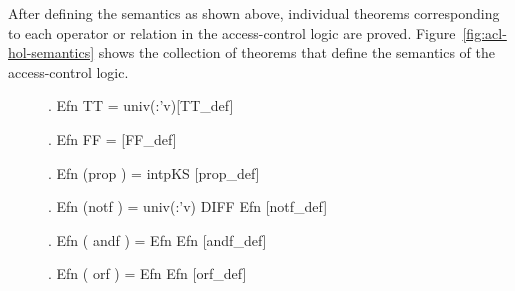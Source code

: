 After defining the semantics as shown above, individual theorems corresponding to each operator or relation in the access-control logic are proved. Figure~\ref{fig:acl-hol-semantics} shows the collection of theorems that define the semantics of the access-control logic.
\begin{figure}[t]
  \centering
\begin{minipage}{1.0\linewidth}
\begin{small}
\HOLTokenTurnstile{} \HOLTokenForall{}  . Efn    TT = univ(:'v)\hfill{[TT\_def]}

\HOLTokenTurnstile{} \HOLTokenForall{}  . Efn    FF = \HOLTokenLeftbrace{}\HOLTokenRightbrace{} \hfill{[FF\_def]}

\HOLTokenTurnstile{} \HOLTokenForall{}   . Efn    (prop ) = intpKS   \hfill{[prop\_def]}

\HOLTokenTurnstile{} \HOLTokenForall{}   . Efn    (notf ) = univ(:'v) DIFF Efn    \hfill{[notf\_def]}

\HOLTokenTurnstile{} \HOLTokenForall{}    .
     Efn    ( andf ) = Efn     \HOLTokenInter{} Efn     \hfill{[andf\_def]}

\HOLTokenTurnstile{} \HOLTokenForall{}    .
     Efn    ( orf ) = Efn     \HOLTokenUnion{} Efn     \hfill{[orf\_def]}


\end{small}
\end{minipage}
\end{figure}
